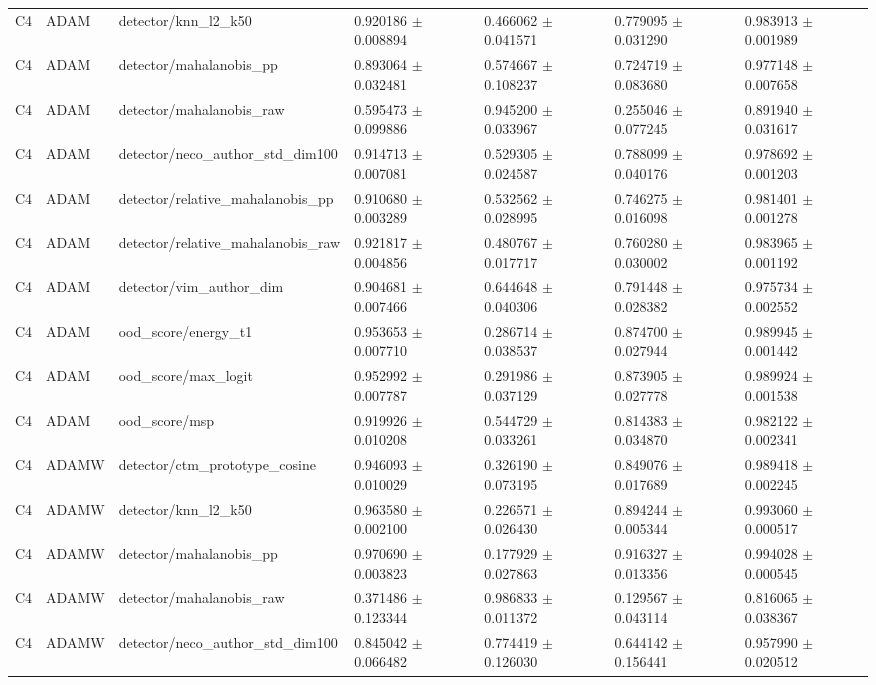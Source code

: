 \begin{longtable}{lllllll}
C4 & ADAM & detector/knn\_l2\_k50 & 0.920186 $\pm$ 0.008894 & 0.466062 $\pm$ 0.041571 & 0.779095 $\pm$ 0.031290 & 0.983913 $\pm$ 0.001989 \\
C4 & ADAM & detector/mahalanobis\_pp & 0.893064 $\pm$ 0.032481 & 0.574667 $\pm$ 0.108237 & 0.724719 $\pm$ 0.083680 & 0.977148 $\pm$ 0.007658 \\
C4 & ADAM & detector/mahalanobis\_raw & 0.595473 $\pm$ 0.099886 & 0.945200 $\pm$ 0.033967 & 0.255046 $\pm$ 0.077245 & 0.891940 $\pm$ 0.031617 \\
C4 & ADAM & detector/neco\_author\_std\_dim100 & 0.914713 $\pm$ 0.007081 & 0.529305 $\pm$ 0.024587 & 0.788099 $\pm$ 0.040176 & 0.978692 $\pm$ 0.001203 \\
C4 & ADAM & detector/relative\_mahalanobis\_pp & 0.910680 $\pm$ 0.003289 & 0.532562 $\pm$ 0.028995 & 0.746275 $\pm$ 0.016098 & 0.981401 $\pm$ 0.001278 \\
C4 & ADAM & detector/relative\_mahalanobis\_raw & 0.921817 $\pm$ 0.004856 & 0.480767 $\pm$ 0.017717 & 0.760280 $\pm$ 0.030002 & 0.983965 $\pm$ 0.001192 \\
C4 & ADAM & detector/vim\_author\_dim & 0.904681 $\pm$ 0.007466 & 0.644648 $\pm$ 0.040306 & 0.791448 $\pm$ 0.028382 & 0.975734 $\pm$ 0.002552 \\
C4 & ADAM & ood\_score/energy\_t1 & 0.953653 $\pm$ 0.007710 & 0.286714 $\pm$ 0.038537 & 0.874700 $\pm$ 0.027944 & 0.989945 $\pm$ 0.001442 \\
C4 & ADAM & ood\_score/max\_logit & 0.952992 $\pm$ 0.007787 & 0.291986 $\pm$ 0.037129 & 0.873905 $\pm$ 0.027778 & 0.989924 $\pm$ 0.001538 \\
C4 & ADAM & ood\_score/msp & 0.919926 $\pm$ 0.010208 & 0.544729 $\pm$ 0.033261 & 0.814383 $\pm$ 0.034870 & 0.982122 $\pm$ 0.002341 \\
C4 & ADAMW & detector/ctm\_prototype\_cosine & 0.946093 $\pm$ 0.010029 & 0.326190 $\pm$ 0.073195 & 0.849076 $\pm$ 0.017689 & 0.989418 $\pm$ 0.002245 \\
C4 & ADAMW & detector/knn\_l2\_k50 & 0.963580 $\pm$ 0.002100 & 0.226571 $\pm$ 0.026430 & 0.894244 $\pm$ 0.005344 & 0.993060 $\pm$ 0.000517 \\
C4 & ADAMW & detector/mahalanobis\_pp & 0.970690 $\pm$ 0.003823 & 0.177929 $\pm$ 0.027863 & 0.916327 $\pm$ 0.013356 & 0.994028 $\pm$ 0.000545 \\
C4 & ADAMW & detector/mahalanobis\_raw & 0.371486 $\pm$ 0.123344 & 0.986833 $\pm$ 0.011372 & 0.129567 $\pm$ 0.043114 & 0.816065 $\pm$ 0.038367 \\
C4 & ADAMW & detector/neco\_author\_std\_dim100 & 0.845042 $\pm$ 0.066482 & 0.774419 $\pm$ 0.126030 & 0.644142 $\pm$ 0.156441 & 0.957990 $\pm$ 0.020512 \\

\end{longtable}
